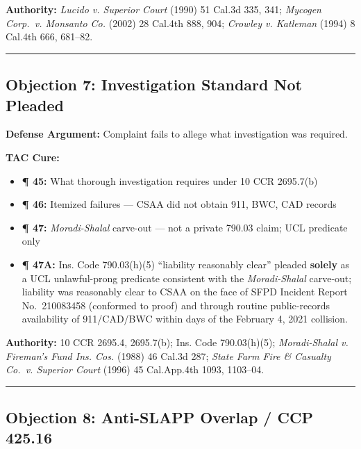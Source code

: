 \textbf{Authority:} \emph{Lucido v. Superior Court} (1990) 51 Cal.3d 335, 341; \emph{Mycogen Corp.~v. Monsanto Co.} (2002) 28 Cal.4th 888, 904; \emph{Crowley v. Katleman} (1994) 8 Cal.4th 666, 681--82.

\begin{center}\rule{0.5\linewidth}{0.5pt}\end{center}

\subsection{Objection 7: Investigation Standard Not Pleaded}\label{objection-7-investigation-standard-not-pleaded}

\textbf{Defense Argument:} Complaint fails to allege what investigation was required.

\textbf{TAC Cure:}

\begin{itemize}
\tightlist
\item
  \textbf{¶ 45:} What thorough investigation requires under 10 CCR \textsection{} 2695.7(b)
\item
  \textbf{¶ 46:} Itemized failures --- CSAA did not obtain 911, BWC, CAD records
\item
  \textbf{¶ 47:} \emph{Moradi-Shalal} carve-out --- not a private \textsection{} 790.03 claim; UCL predicate only
\item
  \textbf{¶ 47A:} Ins. Code \textsection{} 790.03(h)(5) ``liability reasonably clear'' pleaded \textbf{solely} as a UCL unlawful-prong predicate consistent with the \emph{Moradi-Shalal} carve-out; liability was reasonably clear to CSAA on the face of SFPD Incident Report No.~210083458 (conformed to proof) and through routine public-records availability of 911/CAD/BWC within days of the February 4, 2021 collision.
\end{itemize}

\textbf{Authority:} 10 CCR \textsection{}\textsection{} 2695.4, 2695.7(b); Ins. Code \textsection{} 790.03(h)(5); \emph{Moradi-Shalal v. Fireman's Fund Ins. Cos.} (1988) 46 Cal.3d 287; \emph{State Farm Fire \& Casualty Co.~v. Superior Court} (1996) 45 Cal.App.4th 1093, 1103--04.

\begin{center}\rule{0.5\linewidth}{0.5pt}\end{center}

\subsection{Objection 8: Anti-SLAPP Overlap / CCP \textsection{} 425.16}\label{objection-8-anti-slapp-overlap-ccp-425.16}

